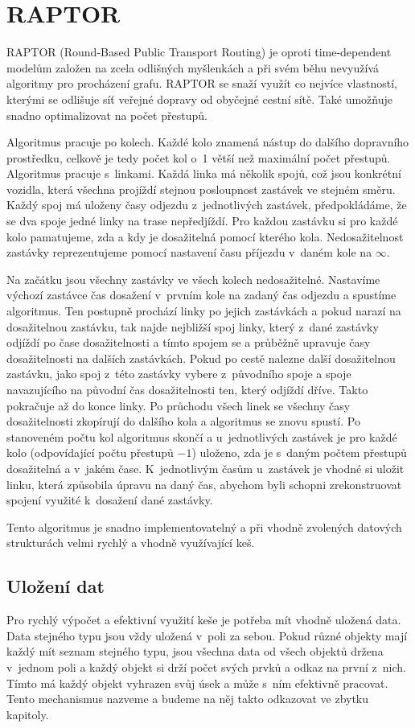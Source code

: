 \section{RAPTOR}
RAPTOR (Round-Based Public Transport Routing)\cite{RAPTOR} je oproti
time-dependent modelům založen na zcela odlišných myšlenkách a při svém běhu
nevyužívá algoritmy pro procházení grafu. RAPTOR se snaží využít co nejvíce vlastností,
kterými se odlišuje síť veřejné dopravy od obyčejné cestní sítě. Také umožňuje
snadno optimalizovat na počet přestupů.

Algoritmus pracuje po kolech. Každé kolo znamená nástup do dalšího dopravního
prostředku, celkově je tedy počet kol o~1 větší než maximální počet přestupů.
Algoritmus pracuje s~linkami. Každá linka má několik spojů, což jsou konkrétní
vozidla, která všechna projíždí stejnou posloupnost zastávek ve stejném směru. Každý spoj má
uloženy časy odjezdu z~jednotlivých zastávek, předpokládáme, že se dva spoje
jedné linky na trase nepředjíždí. Pro každou zastávku si pro každé kolo
pamatujeme, zda a kdy je dosažitelná pomocí kterého kola. Nedosažitelnost
zastávky reprezentujeme pomocí nastavení času příjezdu v~daném kole na $\infty$.

Na začátku jsou všechny zastávky ve všech kolech nedosažitelné. Nastavíme
výchozí zastávce čas dosažení v~prvním kole na zadaný čas odjezdu a spustíme
algoritmus. Ten postupně prochází linky po jejich zastávkách a pokud narazí na
dosažitelnou zastávku, tak najde nejbližší spoj linky, který z~dané zastávky
odjíždí po čase dosažitelnosti a tímto spojem se  a průběžně upravuje
časy dosažitelnosti na dalších zastávkách. Pokud po cestě nalezne další
dosažitelnou zastávku, jako spoj z~této zastávky vybere z~původního spoje a
spoje navazujícího na původní čas dosažitelnosti ten, který odjíždí dříve. Takto
pokračuje až do konce linky. Po průchodu všech linek se všechny časy
dosažitelnosti zkopírují do dalšího kola a algoritmus se znovu spustí. Po
stanoveném počtu kol algoritmus skončí a u~jednotlivých zastávek je pro každé
kolo (odpovídající počtu přestupů $- 1$) uloženo, zda je s~daným počtem přestupů
dosažitelná a v~jakém čase. K~jednotlivým časům u~zastávek je vhodné si uložit
linku, která způsobila úpravu na daný čas, abychom byli schopni zrekonstruovat
spojení využité k~dosažení dané zastávky. 

Tento algoritmus je snadno implementovatelný a při vhodně zvolených datových
strukturách velmi rychlý a vhodně využívající keš. 

\subsection{Uložení dat}
\label{ch:reserse:raptor-data}
Pro rychlý výpočet a efektivní využití keše je potřeba mít vhodně uložená data.
Data stejného typu jsou vždy uložená v~poli za sebou. Pokud různé objekty mají
každý mít seznam stejného typu, jsou všechna data od všech objektů držena
v~jednom poli a každý objekt si drží počet svých prvků a odkaz na první z~nich.
Tímto má každý objekt vyhrazen svůj úsek a může s~ním efektivně pracovat. Tento
mechanismus nazveme  a budeme na něj takto odkazovat ve
zbytku kapitoly.

